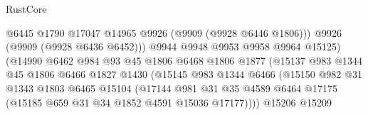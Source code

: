 \begin{lexlean}{RustCore}
\begin{coremodule}
                                            @6445
                                            @1790
                                            @17047
                                            @14965
                                            @9926
                                            (@9909 (@9928 @6446 @1806)))
                                          @9926
                                          (@9909 (@9928 @6436 @6452)))
                                        @9944
                                        @9948
                                        @9953
                                        @9958
                                        @9964
                                        @15125)
                                      (@14990
                                        @6462
                                        @984
                                        @93
                                        @45
                                        @1806
                                        @6468
                                        @1806
                                        @1877
                                        (@15137
                                          @983
                                          @1344
                                          @45
                                          @1806
                                          @6466
                                          @1827
                                          @1430
                                          (@15145
                                            @983
                                            @1344
                                            @6466
                                            (@15150
                                              @982
                                              @31
                                              @1343
                                              @1803
                                              @6465
                                              @15104
                                              (@17144
                                                @981
                                                @31
                                                @35
                                                @4589
                                                @6464
                                                @17175
                                                (@15185 @659 @31 @34 @1852 @4591 @15036 @17177))))
                                          @15206
                                          @15209

\end{coremodule}
\end{lexlean}

